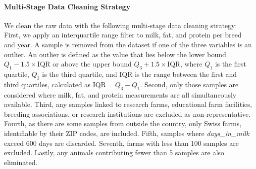 \paragraph{Multi-Stage Data Cleaning Strategy}
We clean the raw data with the following multi-stage data cleaning strategy: First, we apply an interquartile range filter to milk, fat, and protein per breed and year. A sample is removed from the dataset if one of the three variables is an outlier. An outlier is defined as the value that lies below the lower bound $ Q_1 - 1.5 \times \text{IQR}$ or above the upper bound $ Q_3 + 1.5 \times \text{IQR} $, where $ Q_1 $ is the first quartile, $ Q_3 $ is the third quartile, and IQR is the range between the first and third quartiles, calculated as $\text{IQR} = Q_3 - Q_1 $.
Second, only those samples are considered where milk, fat, and protein measurements are all simultaneously available. Third, any samples linked to research farms, educational farm facilities, breeding associations, or research institutions are excluded as non-representative. Fourth, as there are some samples from outside the country, only Swiss farms, identifiable by their ZIP codes, are included. Fifth, samples where \textit{days\_in\_milk} exceed 600 days are discarded. Seventh, farms with less than 100 samples are excluded. Lastly, any animals contributing fewer than 5 samples are also eliminated.

